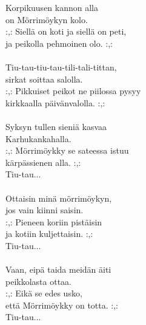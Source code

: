 
        Korpikuusen kannon alla \\
        on Mörrimöykyn kolo. \\
        :,: Siellä on koti ja siellä on peti, \\
        ja peikolla pehmoinen olo. :,: \\
\hspace{10mm} \\
        Tiu-tau-tiu-tau-tili-tali-tittan, \\
        sirkat soittaa salolla. \\
        :,: Pikkuiset peikot ne piilossa pysyy \\
        kirkkaalla päivänvalolla. :,: \\
\hspace{10mm} \\
        Syksyn tullen sieniä kasvaa \\
        Karhukankahalla. \\
        :,: Mörrimöykky se sateessa istuu \\
        kärpässienen alla. :,: \\
        Tiu-tau... \\
\hspace{10mm} \\
        Ottaisin minä mörrimöykyn, \\
        jos vain kiinni saisin. \\
        :,: Pieneen koriin pistäisin \\
        ja kotiin kuljettaisin. :,: \\
        Tiu-tau... \\
\hspace{10mm} \\
        Vaan, eipä taida meidän äiti  \\
        peikkolasta ottaa. \\
        :,: Eikä se edes usko, \\
        että Mörrimöykky on totta. :,: \\
        Tiu-tau... \\
